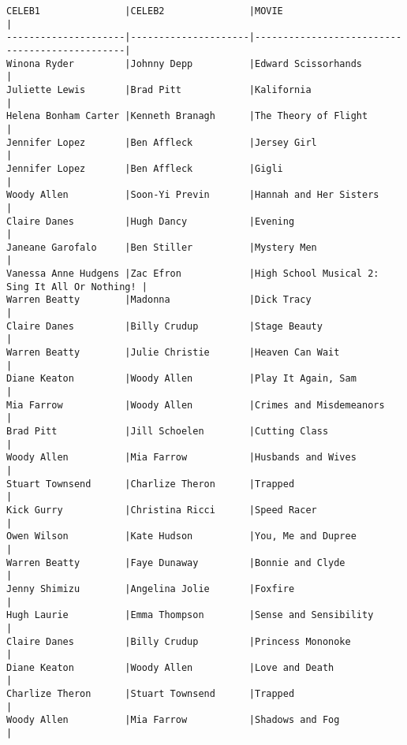 \documentclass{article}
\begin{document}
        \begin{verbatim}
CELEB1               |CELEB2               |MOVIE                                          |
---------------------|---------------------|-----------------------------------------------|
Winona Ryder         |Johnny Depp          |Edward Scissorhands                            |
Juliette Lewis       |Brad Pitt            |Kalifornia                                     |
Helena Bonham Carter |Kenneth Branagh      |The Theory of Flight                           |
Jennifer Lopez       |Ben Affleck          |Jersey Girl                                    |
Jennifer Lopez       |Ben Affleck          |Gigli                                          |
Woody Allen          |Soon-Yi Previn       |Hannah and Her Sisters                         |
Claire Danes         |Hugh Dancy           |Evening                                        |
Janeane Garofalo     |Ben Stiller          |Mystery Men                                    |
Vanessa Anne Hudgens |Zac Efron            |High School Musical 2: Sing It All Or Nothing! |
Warren Beatty        |Madonna              |Dick Tracy                                     |
Claire Danes         |Billy Crudup         |Stage Beauty                                   |
Warren Beatty        |Julie Christie       |Heaven Can Wait                                |
Diane Keaton         |Woody Allen          |Play It Again, Sam                             |
Mia Farrow           |Woody Allen          |Crimes and Misdemeanors                        |
Brad Pitt            |Jill Schoelen        |Cutting Class                                  |
Woody Allen          |Mia Farrow           |Husbands and Wives                             |
Stuart Townsend      |Charlize Theron      |Trapped                                        |
Kick Gurry           |Christina Ricci      |Speed Racer                                    |
Owen Wilson          |Kate Hudson          |You, Me and Dupree                             |
Warren Beatty        |Faye Dunaway         |Bonnie and Clyde                               |
Jenny Shimizu        |Angelina Jolie       |Foxfire                                        |
Hugh Laurie          |Emma Thompson        |Sense and Sensibility                          |
Claire Danes         |Billy Crudup         |Princess Mononoke                              |
Diane Keaton         |Woody Allen          |Love and Death                                 |
Charlize Theron      |Stuart Townsend      |Trapped                                        |
Woody Allen          |Mia Farrow           |Shadows and Fog                                |

\end{verbatim}
\end{document}
